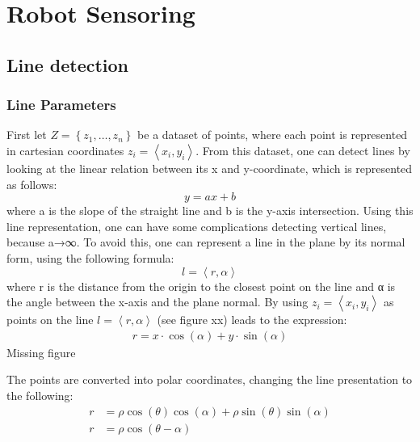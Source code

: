 \documentclass[../Main.tex]{subfiles}
\begin{document}
\section{Robot Sensoring}

\subsection{Line detection}
\subsubsection{Line Parameters}
First let $Z = \left\{z_1, …, z_n\right\}$ be a dataset of points, where each point is represented in cartesian coordinates $z_i=\left\langle x_i, y_i \right\rangle$. From this dataset, one can detect lines by looking at the linear relation between its x and y-coordinate, which is represented as follows:
$$y = ax + b$$
where a is the slope of the straight line and b is the y-axis intersection. Using this line representation, one can have some complications detecting vertical lines, because a→∞. To avoid this, one can represent a line in the plane by its normal form, using the following formula:
$$l=\left\langle r, \alpha \right\rangle$$
where r is the distance from the origin to the closest point on the line and α is the angle between the x-axis and the plane normal. By using $z_i = \left\langle x_i,y_i \right\rangle$ as points on the line $l=\left\langle r, \alpha \right\rangle$ (see figure xx) leads to the expression:
\begin{align}
    r = x\cdot\cos(\alpha)+y\cdot\sin(\alpha)
\end{align}
{\color{red} Missing figure} \par
The points are converted into polar coordinates, changing the line presentation to the following:
\begin{align}
    r &= \rho\cos(\theta)\cos(\alpha)+\rho\sin(\theta)\sin(\alpha) \\
    r &= \rho\cos(\theta - \alpha)
\end{align}
\end{document}
